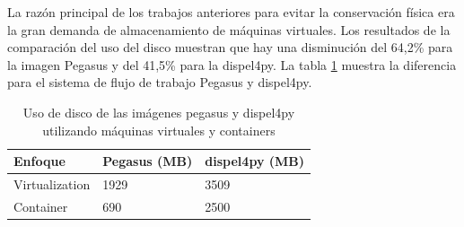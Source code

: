 La razón principal de los trabajos anteriores para evitar la conservación física era la gran demanda de almacenamiento de máquinas virtuales. 
Los resultados de la comparación del uso del disco muestran que hay una disminución del 64,2\% para la imagen Pegasus y del 41,5\% para la dispel4py. La tabla \ref{storage-reduce} muestra la diferencia para el sistema de flujo de trabajo Pegasus y dispel4py.


\begin{table}[]
\centering
\begin{tabular}{|l|l|l|}
\hline
Enfoque        & Pegasus (MB) & dispel4py (MB) \\ \hline
Virtualization & 1929         & 3509 \\ \hline
Container      & 690          & 2500 \\ \hline
\end{tabular}
\caption{Uso de disco de las imágenes pegasus y dispel4py utilizando máquinas virtuales y containers}
\label{storage-reduce}
\end{table}